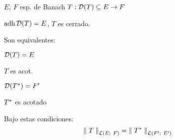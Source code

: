 
\renewcommand{\catnum}{12 (10 No Presencial)}%
\renewcommand{\fecha}{27 de abril de 2020}


\begin{thm}
$E$, $F$ esp. de Banach
$T : \mathcal{D}(T) \subseteq E \to F$

$\operatorname{\mathop{\text{\upshape{adh}}}} \mathcal{D}(T) = E$, $T$ es cerrado.

Son equivalentes:

\begin{ienumerate}
    \item $\mathcal{D}(T) = E$
    \item $T$ es acot.
    \item $ \mathcal{D} (T^{*}) = F' $
    \item $T^{*}$ es acotado
\end{ienumerate}

Bajo estas condiciones:$$
\norm[\cl (E;\ F)]{T} = \norm[\cl (F';\ E')]{T\adj}
$$

\end{thm}

